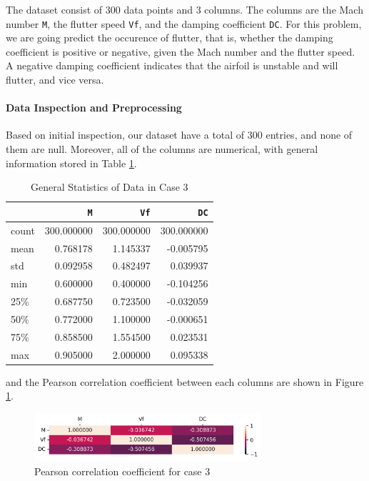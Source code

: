 \documentclass[conf]{new-aiaa}
\begin{document}
The dataset consist of 300 data points and 3 columns. The columns are the Mach number \texttt{M}, the flutter speed \texttt{Vf}, and the damping coefficient \texttt{DC}. For this problem, we are going predict the occurence of flutter, that is, whether the damping coefficient is positive or negative, given the Mach number and the flutter speed. A negative damping coefficient indicates that the airfoil is unstable and will flutter, and vice versa.

\paragraph{Data Inspection and Preprocessing}
Based on initial inspection, our dataset have a total of 300 entries, and none of them are null. Moreover, all of the columns are numerical, with general information stored in Table \ref{tab:case3_data_info}. 
\begin{table}[H]
    \centering
    \caption{ \label{tab:case3_data_info}General Statistics of Data in Case 3}
    \begin{tabular}{lrrr} 
        \toprule
        {} &           \texttt{M} &          \texttt{Vf} &          \texttt{DC} \\
        \midrule
        count &  300.000000 &  300.000000 &  300.000000 \\
        mean  &    0.768178 &    1.145337 &   -0.005795 \\
        std   &    0.092958 &    0.482497 &    0.039937 \\
        min   &    0.600000 &    0.400000 &   -0.104256 \\
        25\%   &    0.687750 &    0.723500 &   -0.032059 \\
        50\%   &    0.772000 &    1.100000 &   -0.000651 \\
        75\%   &    0.858500 &    1.554500 &    0.023531 \\
        max   &    0.905000 &    2.000000 &    0.095338 \\
        \bottomrule
    \end{tabular}
\end{table}
and the Pearson correlation coefficient between each columns are shown in Figure \ref{fig:case3_corr_heatmap}.
\begin{figure}[H]
    \centering
    \includegraphics[width=0.75\textwidth]{graph/case3_corr_heatmap.png}
    \caption{Pearson correlation coefficient for case 3}
    \label{fig:case3_corr_heatmap}
\end{figure}
\end{document}
